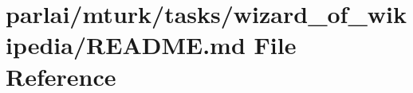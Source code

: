 \hypertarget{parlai_2mturk_2tasks_2wizard__of__wikipedia_2README_8md}{}\section{parlai/mturk/tasks/wizard\+\_\+of\+\_\+wikipedia/\+R\+E\+A\+D\+ME.md File Reference}
\label{parlai_2mturk_2tasks_2wizard__of__wikipedia_2README_8md}
